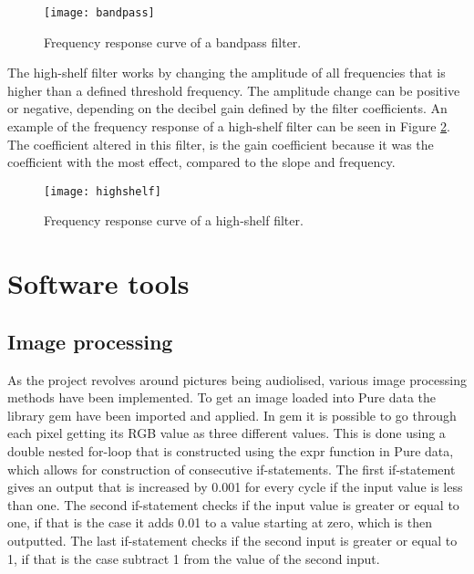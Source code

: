 \begin{figure}
\centering
\texttt{[image: bandpass]}
\caption{Frequency response curve of a bandpass filter.}
\label{fig:bandpass}
\end{figure}

The high-shelf filter works by changing the amplitude of all frequencies that is higher than a defined threshold frequency. The amplitude change can be positive or negative, depending on the decibel gain defined by the filter coefficients\cite{zolzer2011dafx}. An example of the frequency response of a high-shelf filter can be seen in Figure \ref{fig:highshelf}. The coefficient altered in this filter, is the gain coefficient because it was the coefficient with the most effect, compared to the slope and frequency. 

\begin{figure}
\centering
\texttt{[image: highshelf]}
\caption{Frequency response curve of a high-shelf filter.}
\label{fig:highshelf}
\end{figure}

\section{Software tools}\label{sec:softwareTools}
	\subsection{Image processing}\label{sub:imageprocessing}
	As the project revolves around pictures being audiolised, various image processing methods have been implemented. To get an image loaded into Pure data the library gem have been imported and applied. In gem it is possible to go through each pixel getting its RGB value as three different values. This is done using a double nested for-loop that is constructed using the expr function in Pure data, which allows for construction of consecutive if-statements. The first if-statement gives an output that is increased by 0.001 for every cycle if the input value is less than one. The second if-statement checks if the input value is greater or equal to one, if that is the case it adds 0.01 to a value starting at zero, which is then outputted. The last if-statement checks if the second input is greater or equal to 1, if that is the case subtract 1 from the value of the second input.
	
